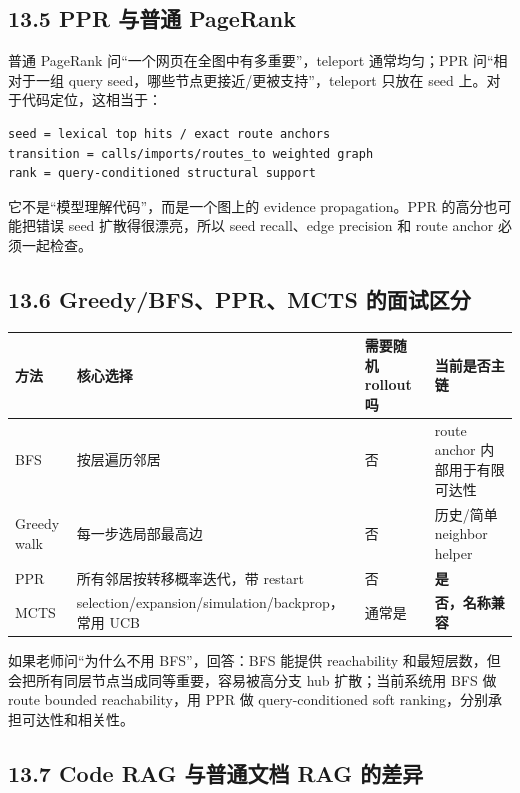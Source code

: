 \documentclass[UTF8,12pt,openany]{ctexbook}
\begin{document}
\subsection{13.5 PPR 与普通 PageRank}

普通 PageRank 问“一个网页在全图中有多重要”，teleport 通常均匀；PPR 问“相对于一组 query seed，哪些节点更接近/更被支持”，teleport 只放在 seed 上。对于代码定位，这相当于：\par

\begin{lstlisting}
seed = lexical top hits / exact route anchors
transition = calls/imports/routes_to weighted graph
rank = query-conditioned structural support
\end{lstlisting}

它不是“模型理解代码”，而是一个图上的 evidence propagation。PPR 的高分也可能把错误 seed 扩散得很漂亮，所以 seed recall、edge precision 和 route anchor 必须一起检查。\par

\subsection{13.6 Greedy/BFS、PPR、MCTS 的面试区分}

\begin{center}
\small
\begin{longtable}{|p{}|p{}|p{}|p{}|}
\toprule
方法 & 核心选择 & 需要随机 rollout 吗 & 当前是否主链 \\
\midrule
BFS & 按层遍历邻居 & 否 & route anchor 内部用于有限可达性 \\
Greedy walk & 每一步选局部最高边 & 否 & 历史/简单 neighbor helper \\
PPR & 所有邻居按转移概率迭代，带 restart & 否 & \textbf{是} \\
MCTS & selection/expansion/simulation/backprop，常用 UCB & 通常是 & \textbf{否，名称兼容} \\
\bottomrule
\end{longtable}
\end{center}

如果老师问“为什么不用 BFS”，回答：BFS 能提供 reachability 和最短层数，但会把所有同层节点当成同等重要，容易被高分支 hub 扩散；当前系统用 BFS 做 route bounded reachability，用 PPR 做 query-conditioned soft ranking，分别承担可达性和相关性。\par

\subsection{13.7 Code RAG 与普通文档 RAG 的差异}
\end{document}
